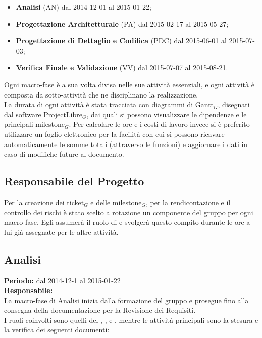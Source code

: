 \begin{itemize}
\item \textbf{Analisi} (AN) dal 2014-12-01 al 2015-01-22;
\item \textbf{Progettazione Architetturale} (PA) dal 2015-02-17 al 2015-05-27;
\item \textbf{Progettazione di Dettaglio e Codifica} (PDC) dal 2015-06-01 al 2015-07-03;
\item \textbf{Verifica Finale e Validazione} (VV) dal 2015-07-07 al 2015-08-21.
\end{itemize}
Ogni macro-fase è a sua volta divisa nelle sue attività essenziali, e ogni attività è composta da sotto-attività che ne disciplinano la realizzazione.\\
La durata di ogni attività è stata tracciata con diagrammi di Gantt$_{G}$, disegnati dal software \href{http://www.projectlibre.org/}{ProjectLibre}$_{G}$, dai quali si possono visualizzare le dipendenze e le principali milestone$_{G}$. Per calcolare le ore e i costi di lavoro invece si è preferito utilizzare un foglio elettronico per la facilità con cui si possono ricavare automaticamente le somme totali (attraverso le funzioni) e aggiornare i dati in caso di modifiche future al documento.

\subsection{Responsabile del Progetto}
Per la creazione dei ticket$_{G}$ e delle milestone$_{G}$, per la rendicontazione e il controllo dei rischi è stato scelto a rotazione un componente del gruppo per ogni macro-fase.
Egli assumerà il ruolo di \ruoloResponsabile{} e svolgerà questo compito durante le ore a lui già assegnate per le altre attività.

\newpage
\subsection{Analisi}
\textbf{Periodo:} dal 2014-12-1 al 2015-01-22 \\
\textbf{Responsabile:} \VeFe \\
La macro-fase di Analisi inizia dalla formazione del gruppo e prosegue fino alla consegna della documentazione per la Revisione dei Requisiti. \\
I ruoli coinvolti sono quelli del \ruoloResponsabile{}, \ruoloAmministratore{}, \ruoloVerificatore{} e \ruoloAnalista{}, mentre le attività principali sono la stesura e la verifica dei seguenti documenti:


